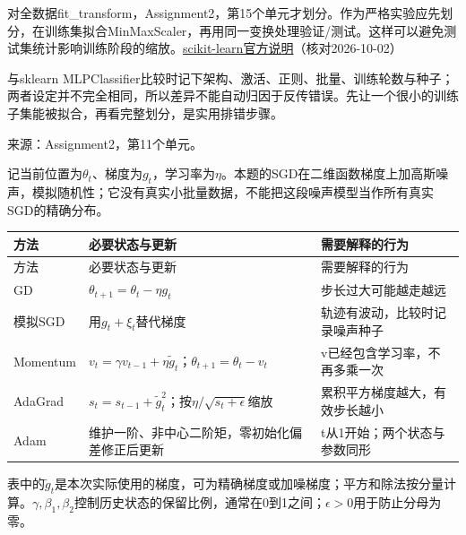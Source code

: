 对全数据fit\_transform，Assignment2，第15个单元才划分。作为严格实验应先划分，在训练集拟合MinMaxScaler，再用同一变换处理验证/测试。这样可以避免测试集统计影响训练阶段的缩放。\href{https://scikit-learn.org/stable/common\_pitfalls.html\#data-leakage}{scikit-learn官方说明}（核对2026-10-02）


与sklearn MLPClassifier比较时记下架构、激活、正则、批量、训练轮数与种子；两者设定并不完全相同，所以差异不能自动归因于反传错误。先让一个很小的训练子集能被拟合，再看完整划分，是实用排错步骤。


来源：Assignment2，第11个单元。








记当前位置为\(\theta_t\)、梯度为\(g_t\)，学习率为\(\eta\)。本题的SGD在二维函数梯度上加高斯噪声，模拟随机性；它没有真实小批量数据，不能把这段噪声模型当作所有真实SGD的精确分布。


\begingroup
\small\setlength{\tabcolsep}{3pt}
\renewcommand{\arraystretch}{1.22}
\begin{longtable}{@{}>{\raggedright\arraybackslash}p{}>{\raggedright\arraybackslash}p{}>{\raggedright\arraybackslash}p{}@{}}
\toprule
方法 & 必要状态与更新 & 需要解释的行为 \\
\midrule\endfirsthead
方法 & 必要状态与更新 & 需要解释的行为 \\
\midrule\endhead
\bottomrule\endfoot
GD & \(\theta_{t+1}=\theta_t-\eta g_t\) & 步长过大可能越走越远 \\
模拟SGD & 用\(g_t+\xi_t\)替代梯度 & 轨迹有波动，比较时记录噪声种子 \\
Momentum & \(v_t=\gamma v_{t-1}+\eta\tilde g_t\)；\(\theta_{t+1}=\theta_t-v_t\) & v已经包含学习率，不再多乘一次 \\
AdaGrad & \(s_t=s_{t-1}+\tilde g_t^2\)；按\(\eta/\sqrt{s_t+\epsilon}\)缩放 & 累积平方梯度越大，有效步长越小 \\
Adam & 维护一阶、非中心二阶矩，零初始化偏差修正后更新 & t从1开始；两个状态与参数同形 \\
\end{longtable}
\endgroup


表中的\(\tilde g_t\)是本次实际使用的梯度，可为精确梯度或加噪梯度；平方和除法按分量计算。\(\gamma,\beta_1,\beta_2\)控制历史状态的保留比例，通常在0到1之间；\(\epsilon>0\)用于防止分母为零。


